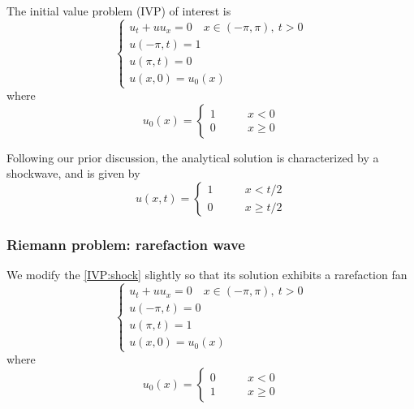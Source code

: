 \documentclass{myproject}
\begin{document}
The initial value problem (IVP) of interest is
\begin{equation}\label{IVP:shock}
    \begin{cases}
        u_t + uu_x = 0 \quad x \in (-\pi,\pi), \: t > 0 \\
        u(-\pi,t) = 1 \\
        u(\pi,t) = 0 \\
        u(x,0) = u_0(x)
    \end{cases} 
\end{equation}
where 
\begin{equation}
    u_0(x) = \begin{cases}
        1 \qquad & x < 0 \\
        0 \qquad & x \geq 0
    \end{cases}
\end{equation}

Following our prior discussion, the analytical solution is characterized by a shockwave, and is given by
\begin{equation}
    u(x,t) = \begin{cases}
        1 \qquad & x < t/2 \\
        0 \qquad & x \geq t/2
    \end{cases}
\end{equation}

\subsubsection{Riemann problem: rarefaction wave}

We modify the \eqref{IVP:shock} slightly so that its solution exhibits a rarefaction fan
\begin{equation}\label{IVP:shock}
    \begin{cases}
        u_t + uu_x = 0 \quad x \in (-\pi,\pi), \: t > 0 \\
        u(-\pi,t) = 0 \\
        u(\pi,t) = 1 \\
        u(x,0) = u_0(x)
    \end{cases} 
\end{equation}
where 
\begin{equation}
    u_0(x) = \begin{cases}
        0 \qquad & x < 0 \\
        1 \qquad & x \geq 0
    \end{cases}
\end{equation}
\end{document}
